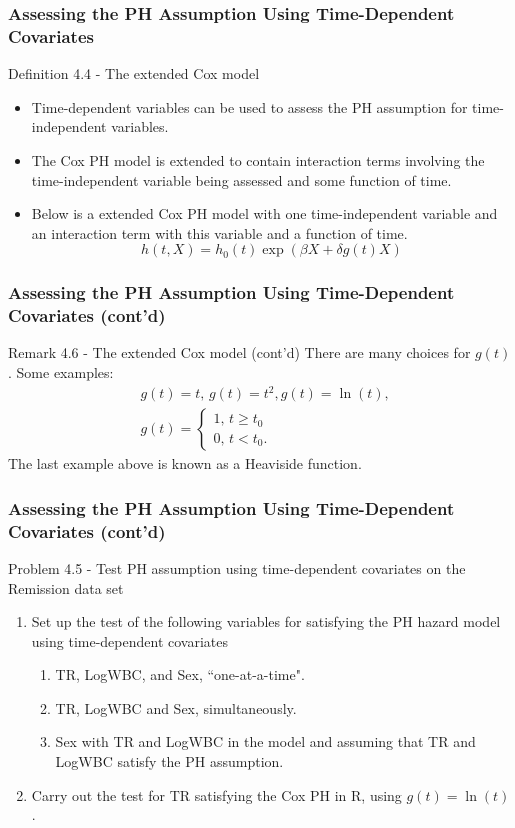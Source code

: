 \documentclass{beamer}
\theoremstyle{definition}
\begin{document}
\begin{frame}
\frametitle{Assessing the PH Assumption Using Time-Dependent Covariates}
\begin{block}{Definition 4.4 - The extended Cox model}
\begin{itemize}
\item Time-dependent variables can be used to assess the PH assumption for time-independent variables.
\item The Cox PH model is extended to contain interaction terms involving the time-independent variable being assessed and some function of time.
\item Below is a extended Cox PH model with one time-independent variable and an interaction term with this variable and a function of time.
\[
h(t,X) = h_0(t)\exp(\beta X + \delta g(t) X)
\]
\end{itemize}
\end{block}
\end{frame}

\begin{frame}
\frametitle{Assessing the PH Assumption Using Time-Dependent Covariates (cont'd)}
\begin{block}{Remark 4.6 - The extended Cox model (cont'd)}
There are many choices for $g(t)$. Some examples:
\begin{align*}
& g(t) = t, \, g(t) = t^2, g(t)=\ln(t),  \\
& g(t) = \begin{cases}
1, \, t \ge t_0\\
0, \, t < t_0.
\end{cases}
\end{align*}
The last example above is known as a Heaviside function.
\end{block}
\end{frame}

\begin{frame}
\frametitle{Assessing the PH Assumption Using Time-Dependent Covariates (cont'd)}
\begin{block}{Problem 4.5 - Test PH assumption using time-dependent covariates on the Remission data set}
\begin{enumerate}
\item Set up the test of the following variables for satisfying the PH hazard model using time-dependent covariates
\begin{enumerate}
\item TR, LogWBC, and Sex, ``one-at-a-time".
\item TR, LogWBC and Sex, simultaneously.
\item Sex with TR and LogWBC in the model and assuming that TR and LogWBC satisfy the PH assumption.
\end{enumerate}
\item Carry out the test for TR satisfying the Cox PH in R, using $g(t) = \ln(t)$.
\end{enumerate}
\end{block}
\end{frame}
\end{document}
